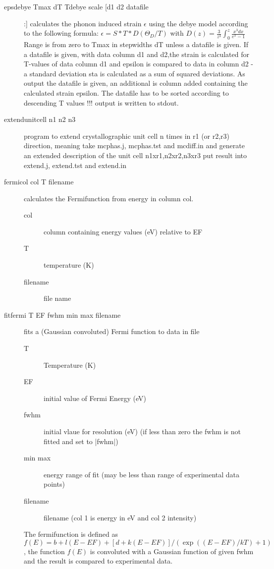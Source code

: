 \begin{description}
\item [\prg epsdebye Tmax dT Tdebye scale [d1 d2 datafile]:]	        
		    calculates the phonon induced strain $\epsilon$ using the debye model
		    according to the following formula:
		    $   \epsilon=S*T*D(\Theta_{D}/T) $
				    with    
		    $D(z)=\frac{3}{z^3}\int_0^z \frac{x^3 dx}{e^x-1}$
                 Range is from zero to Tmax in stepwidths dT
		 unless a datafile is given. 
                 If a  datafile is given, with data column d1 and d2,the strain
                 is calculated for T-values of data column d1 and epsilon
		  is compared to data in column d2 - a standard 
                 deviation sta is calculated as a sum of squared deviations.
                 As output the datafile is given, an additional is column added 
		 containing the calculated strain epsilon. The datafile has to
		 be sorted according to descending T values !!!
                 output is written to stdout.

\item [\prg extendunitcell n1 n2 n3]program to extend crystallographic %
unit cell n 
                times in r1 (or r2,r3) direction, meaning take mcphas.j, mcphas.tst 
                and mcdiff.in and generate an extended description of the unit %
cell 
                n1xr1,n2xr2,n3xr3 put result into extend.j, extend.tst and extend.in

\item [\prg fermicol col T filename] calculates the Fermifunction from energy in column col.
\begin{description}
\item[col] column containing energy values (eV) relative to EF
 \item[T] temperature (K)
 \item[filename] file name
\end{description}
\item[\prg fitfermi T EF fwhm min max filename] 
fits a (Gaussian convoluted) Fermi function to data in file
\begin{description}
\item[T] Temperature (K)
\item[EF] initial value of Fermi Energy (eV)
\item[fwhm] initial vlaue for resolution (eV) (if less than zero the fwhm is not fitted and set to |fwhm|)
\item[min max] energy range of fit (may be less than range of experimental data points)
\item[filename] filename (col 1 is energy in eV and col 2 intensity)
\end{description}
The fermifunction is defined as
      $ f(E)=b+l(E-EF)+[d+k(E-EF)]/(\exp((E-EF)/kT)+1)$, the function
      $ f(E)$ is convoluted with a Gaussian function of given fwhm
            and the  result is compared to experimental data.


\end{description}
